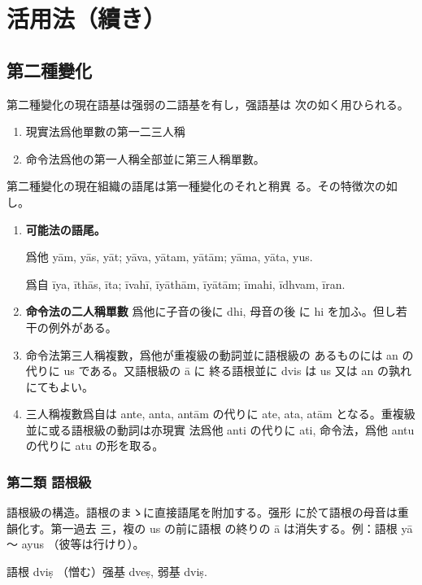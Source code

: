 \section{活用法（續き）}
\subsection{第二種變化}
\numberParagraph \label{np:136}
第二種變化の現在語基は强弱の二語基を有し，强語基は
次の如く用ひられる。
\begin{enumerate}[label=(\alph*)]
\item 現實法爲他單數の第一二三人稱
\item 命令法爲他の第一人稱全部並に第三人稱單數。
\end{enumerate}

\numberParagraph
第二種變化の現在組織の語尾は第一種變化のそれと稍異
る。その特徴次の如し。
\begin{enumerate}[label=(\alph*)]
\item \textbf{可能法の語尾。}

爲他 yām, yās, yāt; yāva, yātam, yātām; yāma,
yāta, yus.

爲自 īya, īthās, īta; īvahī, īyāthām, īyātām; īmahi,
īdhvam, īran.
\item \textbf{命令法の二人稱單數} 爲他に子音の後に dhi, 母音の後
に hi を加ふ。但し若干の例外がある。
\item 命令法第三人稱複數，爲他が重複級の動詞並に語根級の
あるものには an の代りに us である。又語根級の ā に
終る語根並に dvis は us 又は an の孰れにてもよい。
\item 三人稱複數爲自は ante, anta, antām の代りに ate,
ata, atām となる。重複級並に或る語根級の動詞は亦現實
法爲他 anti の代りに ati, 命令法，爲他 antu の代りに
atu の形を取る。
\end{enumerate}

\subsubsection{第二類 語根級}
\numberParagraph \label{np:138}
語根級の構造。語根のまゝに直接語尾を附加する。强形
に於て語根の母音は重韻化す。第一過去 三，複の us の前に語根
の終りの ā は消失する。例：語根 yā ～ ayus （彼等は行けり）。

\numberParagraph
語根 dviṣ （憎む）强基 dveṣ, 弱基 dviṣ.


